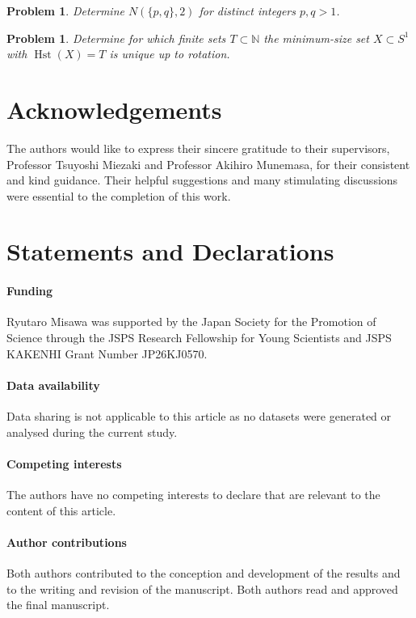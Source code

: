 \documentclass{amsart}
\newtheorem{prob}[thm]{Problem}
\theoremstyle{definition}
\DeclareMathOperator{\Hst}{Hst}
\newcommand{\NN}{\mathbb{N}}
\begin{document}
\begin{prob}
Determine \(N(\{p,q\},2)\) for distinct integers \(p,q>1\).
\end{prob}

\begin{prob}
Determine for which finite sets \(T\subset\NN\) the minimum-size set
\(X\subset S^1\) with \(\Hst(X)=T\) is unique up to rotation.
\end{prob}

\section*{Acknowledgements}
The authors would like to express their sincere gratitude to their supervisors,
Professor Tsuyoshi Miezaki and Professor Akihiro Munemasa, for their consistent
and kind guidance. Their helpful suggestions and many stimulating discussions
were essential to the completion of this work.

\section*{Statements and Declarations}

\paragraph{Funding}
Ryutaro Misawa was supported by the Japan Society for the Promotion of Science
through the JSPS Research Fellowship for Young Scientists and JSPS KAKENHI Grant Number JP26KJ0570.

\paragraph{Data availability}
Data sharing is not applicable to this article as no datasets were generated or
analysed during the current study.

\paragraph{Competing interests}
The authors have no competing interests to declare that are relevant to the
content of this article.

\paragraph{Author contributions}
Both authors contributed to the conception and development of the results and
to the writing and revision of the manuscript. Both authors read and approved
the final manuscript.
\end{document}
